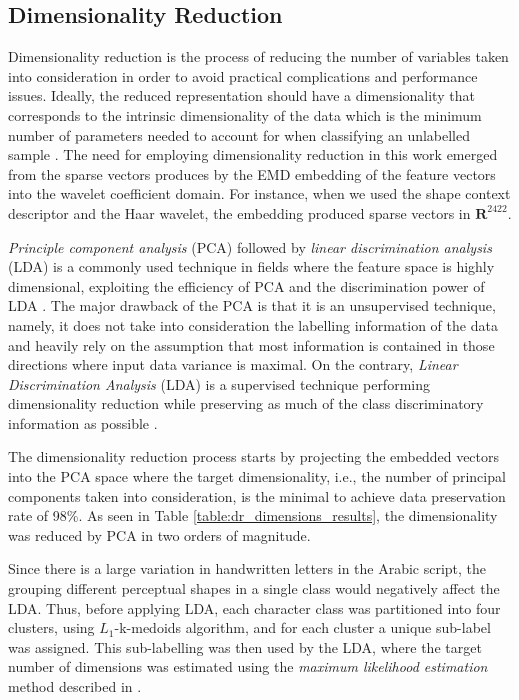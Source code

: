 \documentclass[10pt, conference, compsocconf]{IEEEtran}
\begin{document}
\subsection{Dimensionality Reduction}
\label{subsec:dimensionality_reduction}
Dimensionality reduction is the process of reducing the number of variables taken into consideration in order to avoid practical complications and performance issues. 
Ideally, the reduced representation should have a dimensionality that corresponds to the intrinsic dimensionality of the data which is the minimum number of parameters needed to account for when classifying an unlabelled sample \cite{van2009dimensionality}.
The need for employing dimensionality reduction in this work emerged from the sparse vectors produces by the EMD embedding of the feature vectors into the wavelet coefficient domain.
For instance, when we used the shape context descriptor and the Haar wavelet, the embedding produced sparse vectors in $\mathbf{R}^{2422}$. 

\emph{Principle component analysis} (PCA) followed by \emph{linear discrimination analysis} (LDA) is a commonly used technique in fields where the feature space is highly dimensional, exploiting the efficiency of PCA and the discrimination power of LDA \cite{yu2001direct,yang2003can}.
The major drawback of the PCA is that it is an unsupervised technique, namely, it does not take into consideration the labelling information of the data and heavily rely on the assumption that most information is contained in those directions where input data variance is maximal.
On the contrary, \emph{Linear Discrimination Analysis} (LDA) is a supervised technique performing dimensionality reduction while preserving as much of the class discriminatory information as possible \cite{fisher1936use}. 

The dimensionality reduction process starts by projecting the embedded vectors into the PCA space where the target dimensionality, i.e., the number of principal components taken into consideration, is the minimal to achieve data preservation rate of 98\%.
As seen in Table \ref{table:dr_dimensions_results}, the dimensionality was reduced by PCA in two orders of magnitude.

Since there is a large variation in handwritten letters in the Arabic script, the grouping different perceptual shapes in a single class would negatively affect the LDA.
Thus, before applying LDA, each character class was partitioned into four clusters, using $L_1$-k-medoids algorithm, and for each cluster a unique sub-label was assigned. 
This sub-labelling was then used by the LDA, where the target number of dimensions was estimated using the \emph{maximum likelihood estimation} method described in \cite{levina2004maximum}.
\end{document}

